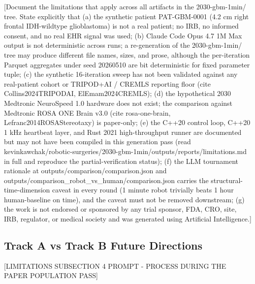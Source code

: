 [Document the limitations that apply across all artifacts in the
2030-gbm-1min/ tree. State explicitly that (a) the synthetic patient
PAT-GBM-0001 (4.2 cm right frontal IDH-wildtype glioblastoma) is not
a real patient; no IRB, no informed consent, and no real EHR signal
was used; (b) Claude Code Opus 4.7 1M Max output is not deterministic
across runs; a re-generation of the 2030-gbm-1min/ tree may produce
different file names, sizes, and prose, although the per-iteration
Parquet aggregates under seed 20260510 are bit deterministic for
fixed parameter tuple; (c) the synthetic 16-iteration sweep has not
been validated against any real-patient cohort or TRIPOD+AI / CREMLS
reporting floor (cite Collins2024TRIPODAI, ElEmam2024CREMLS); (d)
the hypothetical 2030 Medtronic NeuroSpeed 1.0 hardware does not
exist; the comparison against Medtronic ROSA ONE Brain v3.0 (cite
rosa-one-brain, Lefranc2014ROSAStereotaxy) is paper-only; (e) the
C++20 control loop, C++20 1 kHz heartbeat layer, and Rust 2021
high-throughput runner are documented but may not have been compiled
in this generation pass (read
kevinkawchak/robotic-surgeries/2030-gbm-1min/outputs/reports/limitations.md
in full and reproduce the partial-verification status); (f) the LLM
tournament rationale at outputs/comparison/comparison.json and
outputs/comparison_robot_vs_human/comparison.json carries the
structural-time-dimension caveat in every round (1 minute robot
trivially beats 1 hour human-baseline on time), and the caveat must
not be removed downstream; (g) the work is not endorsed or sponsored
by any trial sponsor, FDA, CRO, site, IRB, regulator, or medical
society and was generated using Artificial Intelligence.]

\subsection{Track A vs Track B Future Directions}
\label{sec:limits-tracks}

[LIMITATIONS SUBSECTION 4 PROMPT - PROCESS DURING THE PAPER POPULATION PASS]

